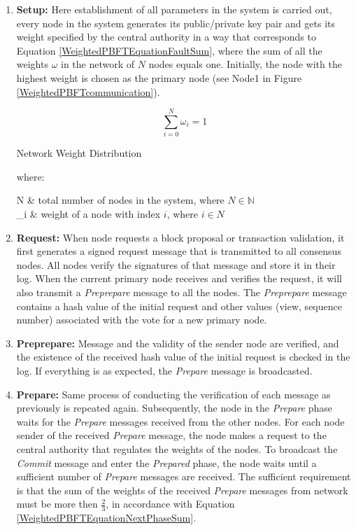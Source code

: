 \begin{enumerate}
    \item \textbf{Setup:} Here establishment of all parameters in the system is carried out, every node in the system generates its public/private key pair and gets its weight specified by the central authority in a way that corresponds to Equation \ref{WeightedPBFTEquationFaultSum}, where the sum of all the weights $\omega$ in the network of $N$ nodes equals one. Initially, the node with the highest weight is chosen as the primary node (see Node1 in Figure \ref{WeightedPBFTcommunication}).

    \begin{equation}
        \sum_{i=0}^{N} \omega_i = 1
        \label{WeightedPBFTEquationFaultSum}
    \end{equation}
    \begin{center}
        Network Weight Distribution
    \end{center}
    where:
    \begin{conditions}
     N     &  total number of nodes in the system, where $N \in \mathbb{N}$ \\
     \omega_i    &  weight of a node with index $ i $, where $ i \in N $
    \end{conditions}
    
    \item \textbf{Request:} When node requests a block proposal or transaction validation, it first generates a signed request message that is transmitted to all consensus nodes. All nodes verify the signatures of that message and store it in their log. When the current primary node receives and verifies the request, it will also transmit a \emph{Preprepare} message to all the nodes. The \emph{Preprepare} message contains a hash value of the initial request and other values (view, sequence number) associated with the vote for a new primary node. 
    \item \textbf{Preprepare:}  Message and the validity of the sender node are verified, and the existence of the received hash value of the initial request is checked in the log. If everything is as expected, the \emph{Prepare} message is broadcasted.
    \item \textbf{Prepare:} Same process of conducting the verification of each message as previously is repeated again. Subsequently, the node in the \emph{Prepare} phase waits for the \emph{Prepare} messages received from the other nodes. For each node sender of the received \emph{Prepare} message, the node makes a request to the central authority that regulates the weights of the nodes. To broadcast the \emph{Commit} message and enter the \emph{Prepared} phase, the node waits until a sufficient number of \emph{Prepare} messages are received. The sufficient requirement is that the sum of the weights of the received \emph{Prepare} messages from network must be more then $\frac{2}{3}$, in accordance with Equation \ref{WeightedPBFTEquationNextPhaseSum}.
  

\end{enumerate}
